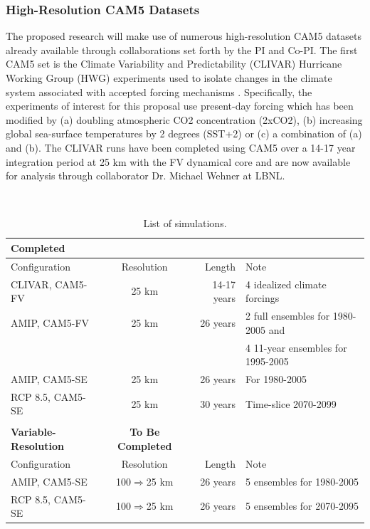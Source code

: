 \documentclass[11pt]{article}
\begin{document}
\subsubsection{High-Resolution CAM5 Datasets} \label{sec:CAM-data} 

The proposed research will make use of numerous high-resolution CAM5 datasets already available through collaborations set forth by the PI and Co-PI. The first CAM5 set is the Climate Variability and Predictability (CLIVAR) Hurricane Working Group (HWG) experiments used to isolate changes in the climate system associated with accepted forcing mechanisms \citep{Wehner2015}.  Specifically, the experiments of interest for this proposal use present-day forcing which has been modified by (a) doubling atmospheric CO2 concentration (2xCO2), (b) increasing global sea-surface temperatures by 2 degrees (SST+2) or (c) a combination of (a) and (b).  The CLIVAR runs have been completed using CAM5 over a 14-17 year integration period at 25 km with the FV dynamical core and are now available for analysis through collaborator Dr. Michael Wehner at LBNL.

\begin{table}
\begin{center}
\caption{List of simulations.\label{t:runs} }
\ \\
\begin{tabular}{l c r l}
\textbf{Completed} \\
\hline
Configuration & Resolution & Length & Note \\ 
\hline
CLIVAR, CAM5-FV & 25 km & 14-17 years & 4 idealized climate forcings  \\
AMIP, CAM5-FV & 25 km & 26 years    & 2 full ensembles for 1980-2005 and  \\
& & & 4 11-year ensembles for 1995-2005 \\
AMIP, CAM5-SE & 25 km & 26 years    &  For 1980-2005 \\
RCP 8.5, CAM5-SE & 25 km & 30 years    & Time-slice 2070-2099 \\
\hline
\\
\textbf{Variable-Resolution} & \textbf{To Be Completed} & & \\
\hline
Configuration & Resolution & Length & Note \\ 
\hline
AMIP, CAM5-SE & 100$\Rightarrow$25 km & 26 years    & 5 ensembles for 1980-2005 \\
RCP 8.5, CAM5-SE & 100$\Rightarrow$25 km & 26 years    & 5 ensembles for 2070-2095 \\
\hline
\end{tabular}
\end{center}
\end{table}
\end{document}
